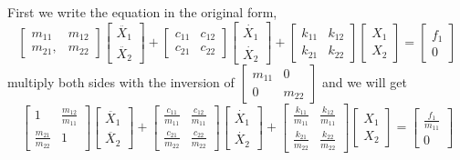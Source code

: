 \documentclass{article}
\begin{document}
	First we write the equation in the original form,
	\begin{equation}
	\begin{bmatrix} m_{11} & m_{12}\\ m_{21},&m_{22}
	\end{bmatrix} \begin{bmatrix}
	\ddot{X_1}\\ \ddot{X_2}
	\end{bmatrix}+\begin{bmatrix} c_{11} & c_{12}\\ c_{21}& c_{22}
	\end{bmatrix} \begin{bmatrix}
	\dot{X_1}\\ \dot{X_2}
	\end{bmatrix}+\begin{bmatrix} k_{11} & k_{12}\\ k_{21}&k_{22}
	\end{bmatrix} \begin{bmatrix}
	X_1\\ X_2
	\end{bmatrix}=\begin{bmatrix}
	f_1\\0
	\end{bmatrix}
	\end{equation}
	multiply both sides with the inversion of $\displaystyle \begin{bmatrix}
	m_{11} & 0\\ 0 & m_{22}
	\end{bmatrix}$ and we will get 
	\begin{equation}
	\begin{bmatrix} 1 & \frac{m_{12}}{m_{11}}\\ \frac{m_{21}}{m_{22}}&1
	\end{bmatrix} \begin{bmatrix}
	\ddot{X_1}\\ \ddot{X_2}
	\end{bmatrix}+\begin{bmatrix} \frac{c_{11}}{m_{11}} & \frac{c_{12}}{m_{11}}\\ \frac{c_{21}}{m_{22}}& \frac{c_{22}}{m_{22}}
	\end{bmatrix} \begin{bmatrix}
	\dot{X_1}\\ \dot{X_2}
	\end{bmatrix}+\begin{bmatrix} \frac{k_{11}}{m_{11}} & \frac{k_{12}}{m_{11}}\\ \frac{k_{21}}{m_{22}}& \frac{k_{22}}{m_{22}}
	\end{bmatrix} \begin{bmatrix}
	X_1\\ X_2
	\end{bmatrix}=\begin{bmatrix}
	\frac{f_1}{m_{11}}\\0
	\end{bmatrix}
	\end{equation}
\end{document}

